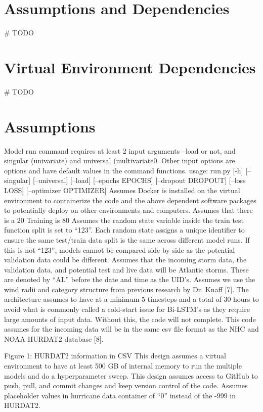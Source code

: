 \documentclass{article}
\begin{document}
\section{Assumptions and Dependencies}
# TODO
\section{Virtual Environment Dependencies}
# TODO
\section{Assumptions}
Model run command requires at least 2 input arguments –load or not, and singular (univariate) and universal (multivariate0. Other input options are options and have default values in the command functions.
usage: run.py [-h] [--singular] [--universal] [--load] [--epochs EPOCHS] [--dropout DROPOUT] [--loss LOSS] [--optimizer OPTIMIZER]
Assumes Docker is installed on the virtual environment to containerize the code and the above dependent software packages to potentially deploy on other environments and computers.
Assumes that there is a 20%
Training is 80%
Assumes the random state variable inside the train test function split is set to “123”. 
Each random state assigns a unique identifier to ensure the same test/train data split is the same across different model runs. If this is not “123”, models cannot be compared side by side as the potential validation data could be different. 
Assumes that the incoming storm data, the validation data, and potential test and live data will be Atlantic storms. These are denoted by “AL” before the date and time as the UID’s.
Assumes we use the wind radii and category structure from previous research by Dr. Knaff [7].
The architecture assumes to have at a minimum 5 timesteps and a total of 30 hours to avoid what is commonly called a cold-start issue for Bi-LSTM’s as they require large amounts of input data. Without this, the code will not complete.
This code assumes for the incoming data will be in the same csv file format as the NHC and NOAA HURDAT2 database [8].


Figure 1: HURDAT2 information in CSV
This design assumes a virtual environment to have at least 500 GB of internal memory to run the multiple models and do a hyperparameter sweep.
This design assumes access to GitHub to push, pull, and commit changes and keep version control of the code. 
Assumes placeholder values in hurricane data container of “0” instead of the -999 in HURDAT2.
\end{document}
